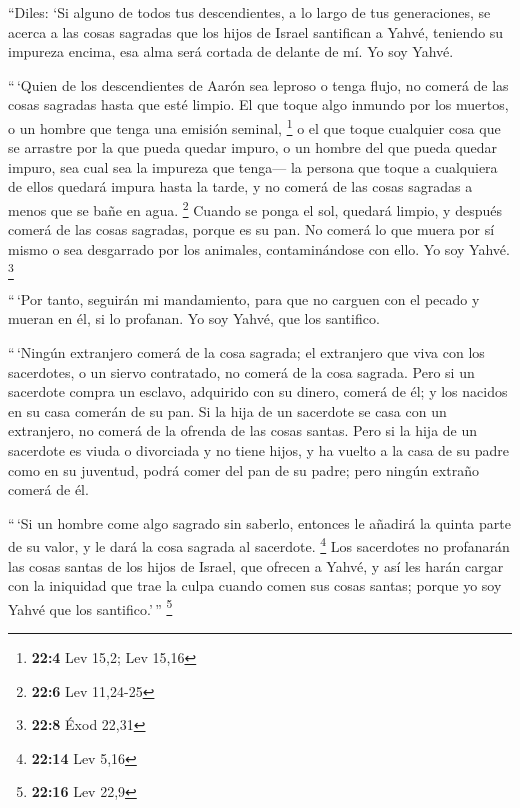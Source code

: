 \begin{paracol}{2}
 ``Diles: `Si alguno de todos tus descendientes, a lo
largo de tus generaciones, se acerca a las cosas sagradas que los hijos
de Israel santifican a Yahvé, teniendo su impureza encima, esa alma será
cortada de delante de mí. Yo soy Yahvé.

 ``\,`Quien de los descendientes de Aarón sea leproso o
tenga flujo, no comerá de las cosas sagradas hasta que esté limpio. El
que toque algo inmundo por los muertos, o un hombre que tenga una
emisión seminal, \footnote{\textbf{22:4} Lev 15,2; Lev 15,16}
 o el que toque cualquier cosa que se arrastre por la que
pueda quedar impuro, o un hombre del que pueda quedar impuro, sea cual
sea la impureza que tenga---  la persona que toque a
cualquiera de ellos quedará impura hasta la tarde, y no comerá de las
cosas sagradas a menos que se bañe en agua. \footnote{\textbf{22:6} Lev
  11,24-25}  Cuando se ponga el sol, quedará limpio, y
después comerá de las cosas sagradas, porque es su pan. 
No comerá lo que muera por sí mismo o sea desgarrado por los animales,
contaminándose con ello. Yo soy Yahvé. \footnote{\textbf{22:8} Éxod
  22,31}

 ``\,`Por tanto, seguirán mi mandamiento, para que no
carguen con el pecado y mueran en él, si lo profanan. Yo soy Yahvé, que
los santifico.

 ``\,`Ningún extranjero comerá de la cosa sagrada; el
extranjero que viva con los sacerdotes, o un siervo contratado, no
comerá de la cosa sagrada.  Pero si un sacerdote compra
un esclavo, adquirido con su dinero, comerá de él; y los nacidos en su
casa comerán de su pan.  Si la hija de un sacerdote se
casa con un extranjero, no comerá de la ofrenda de las cosas santas.
 Pero si la hija de un sacerdote es viuda o divorciada y
no tiene hijos, y ha vuelto a la casa de su padre como en su juventud,
podrá comer del pan de su padre; pero ningún extraño comerá de él.

 ``\,`Si un hombre come algo sagrado sin saberlo,
entonces le añadirá la quinta parte de su valor, y le dará la cosa
sagrada al sacerdote. \footnote{\textbf{22:14} Lev 5,16} 
Los sacerdotes no profanarán las cosas santas de los hijos de Israel,
que ofrecen a Yahvé,  y así les harán cargar con la
iniquidad que trae la culpa cuando comen sus cosas santas; porque yo soy
Yahvé que los santifico.'\,'' \footnote{\textbf{22:16} Lev 22,9}


\end{paracol}
